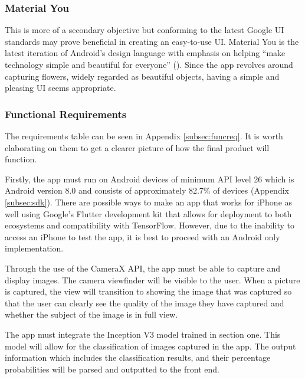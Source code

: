 \documentclass{article}
\begin{document}
\subsubsection*{Material You}

This is more of a secondary objective but conforming to the latest Google UI standards may prove beneficial in creating 
an easy-to-use UI. Material You is the latest iteration of Android's design language with emphasis on helping “make 
technology simple and beautiful for everyone” (\cite{material}). Since the app revolves around capturing flowers, widely 
regarded as beautiful objects, having a simple and pleasing UI seems appropriate. 

\subsubsection{Functional Requirements}

The requirements table can be seen in Appendix \ref{subsec:funcreq}. It is worth elaborating on them to get a clearer 
picture of how the final product will function. 

\par

Firstly, the app must run on Android devices of minimum API level 26 which is Android version 8.0 and 
consists of approximately 82.7\% of devices (Appendix \ref{subsec:sdk}). 
There are possible ways to make an app that works for iPhone as well using Google's Flutter development kit that allows 
for deployment to both ecosystems and compatibility with TensorFlow. However, due to the inability to access an iPhone 
to test the app, it is best to proceed with an Android only implementation.

\par

Through the use of the CameraX API, the app must be able to capture and display images. The camera viewfinder will be 
visible to the user. When a picture is captured, the view will transition to showing the image that was captured so 
that the user can clearly see the quality of the image they have captured and whether the subject of the image is in 
full view.

\par

The app must integrate the Inception V3 model trained in section one. This model will allow for the classification of 
images captured in the app. The output information which includes the classification results, and their percentage 
probabilities will be parsed and outputted to the front end.
\end{document}
